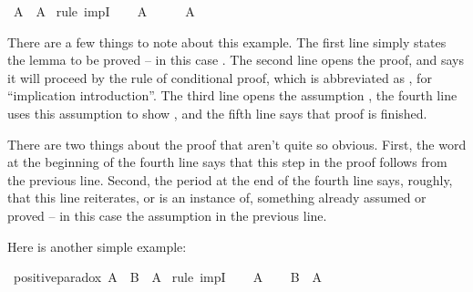 \begin{isabellebody}
\isamarkupfalse%
\ {\isachardoublequoteopen}A\ {\isasymlongrightarrow}\ A{\isachardoublequoteclose}\isanewline
%
\isadelimproof
%
\endisadelimproof
%
\isatagproof
{}\isamarkupfalse%
\ {\isacharparenleft}rule\ impI{\isacharparenright}\isanewline
\ \ \isamarkupfalse%
\ {\isachardoublequoteopen}A{\isachardoublequoteclose}\isanewline
\ \ \isamarkupfalse%
\ \isamarkupfalse%
\ {\isachardoublequoteopen}A{\isachardoublequoteclose}\isacommand{{\isachardot}}\isamarkupfalse%
\isanewline
{}\isamarkupfalse%
%
\endisatagproof
{\isafoldproof}%
%
\isadelimproof
%
\endisadelimproof
%
\begin{isamarkuptext}%
There are a few things to note about this example. The first line simply states the lemma to
be proved -- in this case . The second line opens the proof, and says it will proceed
by the rule of conditional proof, which is abbreviated as , for ``implication 
introduction''. The third line opens the assumption , the fourth line uses this assumption
to show , and the fifth line says that proof is finished.%
\end{isamarkuptext}\isamarkuptrue%
%
\begin{isamarkuptext}%
There are two things about the proof that aren't quite so obvious. First, the word 
at the beginning of the fourth line says that this step in the proof follows from the previous line.
Second, the period at the end of the fourth line says, roughly, that this line reiterates, or is an
instance of, something already assumed or proved -- in this case the assumption in the previous line.%
\end{isamarkuptext}\isamarkuptrue%
%
\begin{isamarkuptext}%
Here is another simple example:%
\end{isamarkuptext}\isamarkuptrue%
\isamarkupfalse%
\ positive{\isacharunderscore}paradox{\isacharcolon}\ {\isachardoublequoteopen}A\ {\isasymlongrightarrow}\ B\ {\isasymlongrightarrow}\ A{\isachardoublequoteclose}\isanewline
%
\isadelimproof
%
\endisadelimproof
%
\isatagproof
{}\isamarkupfalse%
\ {\isacharparenleft}rule\ impI{\isacharparenright}\isanewline
\ \ \isamarkupfalse%
\ {\isachardoublequoteopen}A{\isachardoublequoteclose}\isanewline
\ \ \isamarkupfalse%
\ {\isachardoublequoteopen}B\ {\isasymlongrightarrow}\ A{\isachardoublequoteclose}\isanewline
\ \ \isamarkupfalse%

\end{isabellebody}
